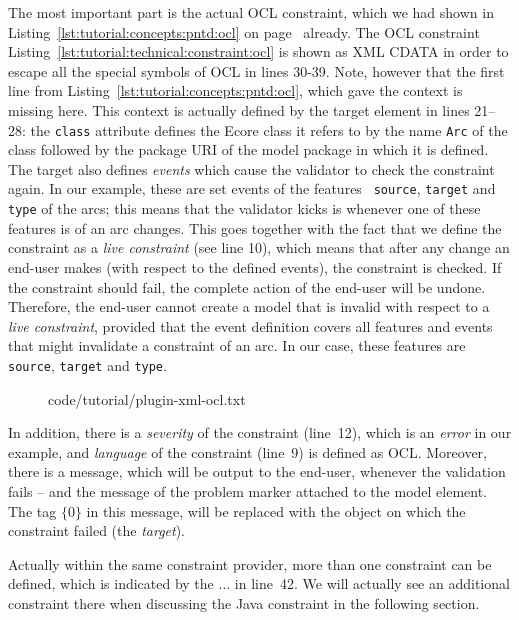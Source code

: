 The most important part is the actual OCL constraint, which we had shown
in Listing~\ref{lst:tutorial:concepts:pntd:ocl} on
page~\pageref{lst:tutorial:concepts:pntd:ocl} already. The OCL constraint
Listing~\ref{lst:tutorial:technical:constraint:ocl}
is shown as XML CDATA in order to escape all the special symbols of OCL in lines
30-39. Note, however that the first line from
Listing~\ref{lst:tutorial:concepts:pntd:ocl}, which gave the context is missing here.
This context is actually defined by the target element in lines 21--28:
the {\tt class} attribute defines the Ecore class it refers to by the name
{\tt Arc} of the class followed by the package URI of the model package in which
it is defined. The target also defines \emph{events} which cause the validator to check the
constraint again. In our example, these are set events of the features {\tt
source}, {\tt target} and {\tt type} of the arcs; this means that the validator
kicks is whenever one of these features is of an arc changes. This goes
together with the fact that we define the constraint as a \emph{live constraint}
(see line 10), which means that after any change an end-user makes (with respect
to the defined events), the constraint is checked. If the constraint should fail, the complete
action of the end-user will be undone. Therefore, the end-user cannot create
a model that is invalid with respect to a \emph{live constraint}, provided that
the event definition covers all features and events that might invalidate a
constraint of an arc. In our case, these features are {\tt source}, {\tt target}
and {\tt type}.

\begin{figure}[htbp!]
%
  {code/tutorial/plugin-xml-ocl.txt}
\end{figure}

In addition, there is a \emph{severity} of the constraint (line~12), which is an
\emph{error} in our example, and \emph{language} of the constraint (line~9) is
defined as OCL. Moreover, there is a message, which will be output to the
end-user, whenever the validation fails -- and the message of the problem marker
attached to the model element.
The tag $\{0\}$ in this message, will be replaced with the object on which the
constraint failed (the \emph{target}).

Actually within the same constraint provider, more than one constraint can be
defined, which is indicated by the $\ldots$ in line~42. We will actually see an
additional constraint there when discussing the Java constraint in the following
section.\\


